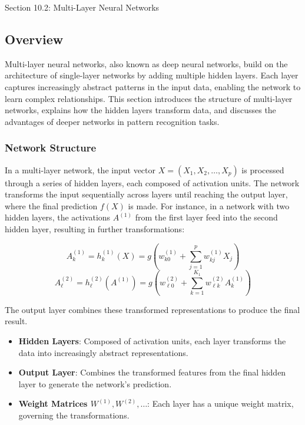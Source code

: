 \begin{notes}{Section 10.2: Multi-Layer Neural Networks}
    \subsection*{Overview}

    Multi-layer neural networks, also known as deep neural networks, build on the architecture of single-layer networks by adding multiple hidden layers. Each layer captures increasingly abstract patterns 
    in the input data, enabling the network to learn complex relationships. This section introduces the structure of multi-layer networks, explains how the hidden layers transform data, and discusses the 
    advantages of deeper networks in pattern recognition tasks.
    
    \subsubsection*{Network Structure}
    
    In a multi-layer network, the input vector $X = (X_1, X_2, \ldots, X_p)$ is processed through a series of hidden layers, each composed of activation units. The network transforms the input sequentially 
    across layers until reaching the output layer, where the final prediction $f(X)$ is made. For instance, in a network with two hidden layers, the activations $A^{(1)}$ from the first layer feed into the 
    second hidden layer, resulting in further transformations:
    
    \[
    A^{(1)}_k = h^{(1)}_k(X) = g\left(w^{(1)}_{k0} + \sum_{j=1}^{p} w^{(1)}_{kj} X_j \right)
    \]
    \[
    A^{(2)}_\ell = h^{(2)}_\ell(A^{(1)}) = g\left(w^{(2)}_{\ell 0} + \sum_{k=1}^{K_1} w^{(2)}_{\ell k} A^{(1)}_k \right)
    \]
    
    The output layer combines these transformed representations to produce the final result.
    
    \begin{highlight}
        \begin{itemize}
            \item \textbf{Hidden Layers}: Composed of activation units, each layer transforms the data into increasingly abstract representations.
            \item \textbf{Output Layer}: Combines the transformed features from the final hidden layer to generate the network's prediction.
            \item \textbf{Weight Matrices $W^{(1)}, W^{(2)}, \dots$}: Each layer has a unique weight matrix, governing the transformations.
        \end{itemize}
    \end{highlight}
    

\end{notes}
